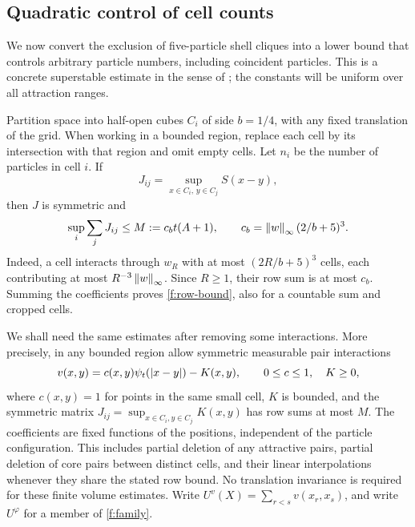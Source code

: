 \subsection{Quadratic control of cell counts}

We now convert the exclusion of five-particle shell cliques into a
lower bound that controls arbitrary particle numbers, including
coincident particles.  This is a concrete superstable estimate in the
sense of \citet{Ruelle1970}; the constants will be uniform over all
attraction ranges.

Partition space into half-open cubes $C_i$ of side $b=1/4$, with any
fixed translation of the grid.  When working in a bounded region,
replace each cell by its intersection with that region and omit empty
cells.  Let $n_i$ be the number of particles in cell $i$.  If
\[
 J_{ij}=\sup_{x\in C_i,\,y\in C_j}S(x-y),
\]
then $J$ is symmetric and
\begin{equation}\label{f:row-bound}
 \sup_i\sum_jJ_{ij}\le M:=c_b t(A+1),
 \qquad c_b=\left\lVert w\right\rVert_\infty(2/b+5)^3.
\end{equation}
Indeed, a cell interacts through $w_R$ with at most $(2R/b+5)^3$
cells, each contributing at most $R^{-3}\left\lVert w\right\rVert_\infty$.  Since
$R\ge1$, their row sum is at most $c_b$.  Summing the coefficients
proves \eqref{f:row-bound}, also for a countable sum and cropped cells.

We shall need the same estimates after removing some interactions.
More precisely, in any bounded region allow symmetric measurable
pair interactions
\begin{equation}\label{f:modified-energy}
 v(x,y)=c(x,y)\psi_t(\left|x-y\right|)-K(x,y),
 \qquad 0\le c\le1,\quad K\ge0,
\end{equation}
where $c(x,y)=1$ for points in the same small cell, $K$ is bounded,
and the symmetric matrix
$J_{ij}=\sup_{x\in C_i,y\in C_j}K(x,y)$ has row sums at most $M$.
The coefficients are fixed functions of the positions, independent of
the particle configuration.  This includes partial deletion of any
attractive pairs, partial deletion of core pairs between distinct
cells, and their linear interpolations whenever they share the stated
row bound.  No translation invariance is required for these finite
volume estimates.  Write $U^v(X)=\sum_{r<s}v(x_r,x_s)$, and write
$U^\varphi$ for a member of \eqref{f:family}.

